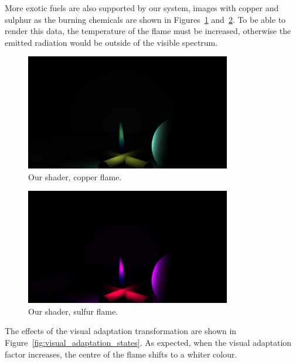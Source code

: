 More exotic fuels are also supported by our system, images with copper and sulphur as the burning chemicals are shown in Figures~\ref{fig:result_copper} and~\ref{fig:result_sulfur}.
To be able to render this data, the temperature of the flame must be increased, otherwise the emitted radiation would be outside of the visible spectrum.

\begin{figure}[htbp]
	\centering
	\includegraphics[width=0.8\textwidth, trim={8cm 0 8cm 10cm}, clip]{img/result_copper}
	\caption{Our shader, copper flame.}
	\label{fig:result_copper}
\end{figure}

\begin{figure}[htbp]
	\centering
	\includegraphics[width=0.8\textwidth, trim={8cm 0 8cm 10cm}, clip]{img/result_sulfur}
	\caption{Our shader, sulfur flame.}
	\label{fig:result_sulfur}
\end{figure}

The effects of the visual adaptation transformation are shown in Figure~\ref{fig:visual_adaptation_states}.
As expected, when the visual adaptation factor increases, the centre of the flame shifts to a whiter colour.

